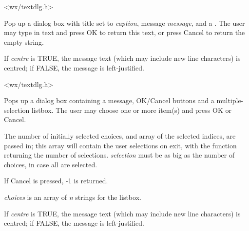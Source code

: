 
<wx/textdlg.h>

\label{wxgettextfromuser}


Pop up a dialog box with title set to {\it caption}, message {\it message}, and a
.  The user may type in text and press OK to return this text,
or press Cancel to return the empty string.

If {\it centre} is TRUE, the message text (which may include new line characters)
is centred; if FALSE, the message is left-justified.


<wx/textdlg.h>

\label{wxgetmultiplechoice}


Pops up a dialog box containing a message, OK/Cancel buttons and a multiple-selection
listbox. The user may choose one or more item(s) and press OK or Cancel.

The number of initially selected choices, and array of the selected indices,
are passed in; this array will contain the user selections on exit, with
the function returning the number of selections. {\it selection} must be
as big as the number of choices, in case all are selected.

If Cancel is pressed, -1 is returned.

{\it choices} is an array of {\it n} strings for the listbox.

If {\it centre} is TRUE, the message text (which may include new line characters)
is centred; if FALSE, the message is left-justified.

